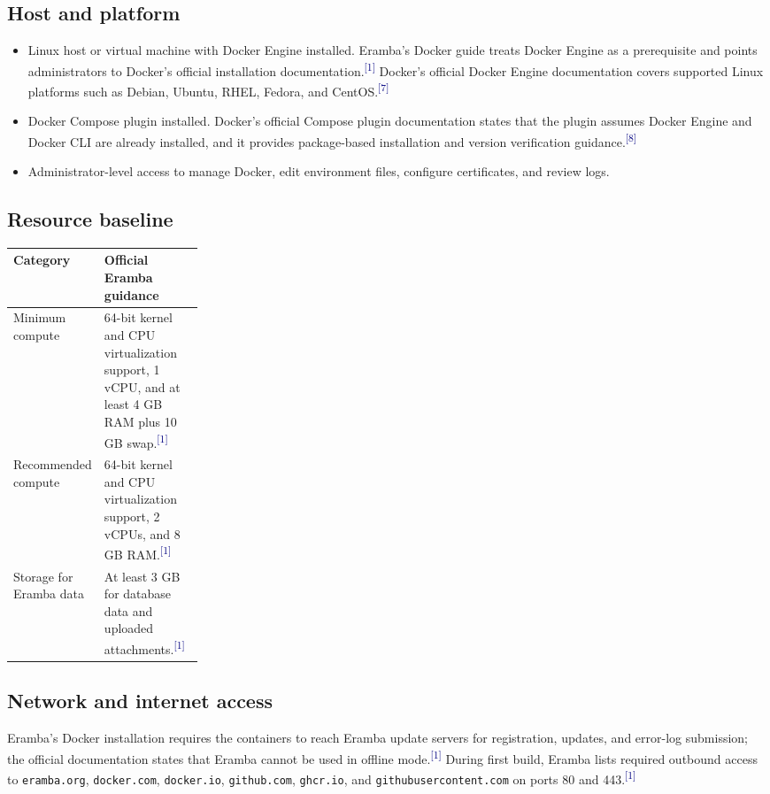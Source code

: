 \documentclass[10pt,letterpaper]{article}
\newcommand{\source}[1]{\textsuperscript{\textcolor{navy}{#1}}}
\begin{document}
\subsection{Host and platform}
\begin{itemize}
  \item Linux host or virtual machine with Docker Engine installed. Eramba's Docker guide treats Docker Engine as a prerequisite and points administrators to Docker's official installation documentation.\source{[1]} Docker's official Docker Engine documentation covers supported Linux platforms such as Debian, Ubuntu, RHEL, Fedora, and CentOS.\source{[7]}
  \item Docker Compose plugin installed. Docker's official Compose plugin documentation states that the plugin assumes Docker Engine and Docker CLI are already installed, and it provides package-based installation and version verification guidance.\source{[8]}
  \item Administrator-level access to manage Docker, edit environment files, configure certificates, and review logs.
\end{itemize}

\subsection{Resource baseline}
\begin{center}
\begin{tabularx}{\linewidth}{L{0.25\linewidth}Y}
\toprule
\textbf{Category} & \textbf{Official Eramba guidance} \\
\midrule
Minimum compute & 64-bit kernel and CPU virtualization support, 1 vCPU, and at least 4 GB RAM plus 10 GB swap.\source{[1]} \\
Recommended compute & 64-bit kernel and CPU virtualization support, 2 vCPUs, and 8 GB RAM.\source{[1]} \\
Storage for Eramba data & At least 3 GB for database data and uploaded attachments.\source{[1]} \\
\bottomrule
\end{tabularx}
\end{center}

\subsection{Network and internet access}
Eramba's Docker installation requires the containers to reach Eramba update servers for registration, updates, and error-log submission; the official documentation states that Eramba cannot be used in offline mode.\source{[1]} During first build, Eramba lists required outbound access to \texttt{eramba.org}, \texttt{docker.com}, \texttt{docker.io}, \texttt{github.com}, \texttt{ghcr.io}, and \texttt{githubusercontent.com} on ports 80 and 443.\source{[1]}
\end{document}
